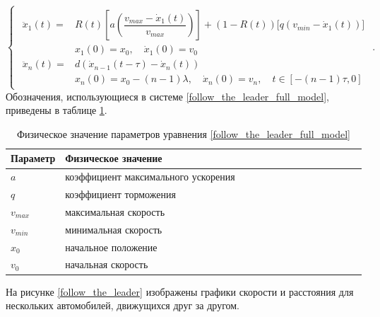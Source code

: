 \documentclass[12pt, a4paper]{extarticle}
\numberwithin{equation}{section}
\begin{document}
\begin{equation} \label{follow_the_leader_full_model}
\begin{cases}
\begin{split}
\ddot{x}_1(t) = &R(t) \left[ a\left(\dfrac{v_{max}-\dot{x}_1(t)}{v_{max}} \right)\right] + (1-R(t)) \bigg[ q\left( v_{min} - \dot{x}_1(t)\right) \bigg]  \\
&x_{1}(0)=x_0, \quad \dot{x}_{1}(0)=v_{0}\\
\ddot{x}_{n}(t) = &d(\dot{x}_{n-1}(t-\tau)-\dot{x}_{n}(t)) \\
&x_n(0)=x_0-(n-1)\lambda, \quad \dot{x}_n(0)=v_{n}, \quad t \in [-(n-1)\tau,0]
\end{split}
\end{cases}.
\end{equation}
Обозначения, использующиеся в системе \eqref{follow_the_leader_full_model}, приведены в таблице \ref{follow_the_leader_full_model_parameters}.
\begin{table}[h!]
	\caption{Физическое значение параметров уравнения \eqref{follow_the_leader_full_model}}
	\label{follow_the_leader_full_model_parameters}
	\begin{center}
		\begin{tabularx}{\textwidth}{p{0.15\linewidth}p{0.85\linewidth}}			
			\hline
			\rule{0cm}{0,5cm}
			Параметр &  Физическое значение \\ 
			[3pt]\hline
			$a$ & коэффициент максимального ускорения\\
			$q$ & коэффициент торможения\\ 
			$v_{max}$ & максимальная скорость\\
			$v_{min}$ & минимальная скорость\\ 
			$x_0$ & начальное положение\\
			$v_0$ & начальная скорость\\ 
			\hline
		\end{tabularx}
	\end{center}
\end{table}


На рисунке \eqref{follow_the_leader} изображены графики скорости и расстояния для нескольких автомобилей, движущихся друг за другом.
\end{document}
